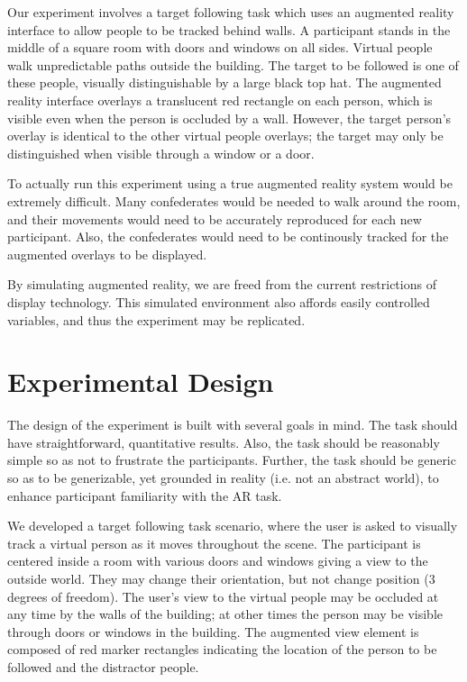 \documentclass{acmsiggraph}                     %
\begin{document}
Our experiment involves a target following task which uses an augmented reality interface to allow people to be tracked behind walls.  A participant stands in the middle of a square room with doors and windows on all sides.  Virtual people walk unpredictable paths outside the building.  The target to be followed is one of these people, visually distinguishable by a large black top hat.  The augmented reality interface overlays a translucent red rectangle on each person, which is visible even when the person is occluded by a wall.  However, the target person's overlay is identical to the other virtual people overlays; the target may only be distinguished when visible through a window or a door.

To actually run this experiment using a true augmented reality system would be extremely difficult.  Many confederates would be needed to walk around the room, and their movements would need to be accurately reproduced for each new participant.  Also, the confederates would need to be continously tracked for the augmented overlays to be displayed.%

By simulating augmented reality, we are freed from the current restrictions of display technology.  This simulated environment also affords easily controlled variables, and thus the experiment may be replicated.

\section{Experimental Design}

The design of the experiment is built with several goals in mind.  The task should have straightforward, quantitative results.  Also, the task should be reasonably simple so as not to frustrate the participants.  Further, the task should be generic so as to be generizable, yet grounded in reality (i.e. not an abstract world), to enhance participant familiarity with the AR task.

We developed a target following task scenario, where the user is asked to visually track a virtual person as it moves throughout the scene.  The participant is centered inside a room with various doors and windows giving a view to the outside world.  They may change their orientation, but not change position (3 degrees of freedom).  The user's view to the virtual people may be occluded at any time by the walls of the building; at other times the person may be visible through doors or windows in the building.  The augmented view element is composed of red marker rectangles indicating the location of the person to be followed and the distractor people.
\end{document}
